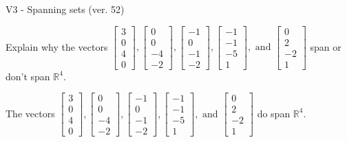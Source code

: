 \begin{exercise}
  \begin{exerciseTitle}V3 - Spanning sets (ver. 52)\end{exerciseTitle}
  \begin{exerciseStatement}
    Explain why the vectors \(\left[\begin{array}{r}
3 \\
0 \\
4 \\
0
\end{array}\right] , \left[\begin{array}{r}
0 \\
0 \\
-4 \\
-2
\end{array}\right] , \left[\begin{array}{r}
-1 \\
0 \\
-1 \\
-2
\end{array}\right] , \left[\begin{array}{r}
-1 \\
-1 \\
-5 \\
1
\end{array}\right] , \text{ and } \left[\begin{array}{r}
0 \\
2 \\
-2 \\
1
\end{array}\right]\) span or don't span \(\mathbb{R}^4\). 
	


  \end{exerciseStatement}
  \begin{exerciseAnswer}
   The vectors \(\left[\begin{array}{r}
3 \\
0 \\
4 \\
0
\end{array}\right] , \left[\begin{array}{r}
0 \\
0 \\
-4 \\
-2
\end{array}\right] , \left[\begin{array}{r}
-1 \\
0 \\
-1 \\
-2
\end{array}\right] , \left[\begin{array}{r}
-1 \\
-1 \\
-5 \\
1
\end{array}\right] , \text{ and } \left[\begin{array}{r}
0 \\
2 \\
-2 \\
1
\end{array}\right]\) 
  	 do  
	span \(\mathbb{R}^4\).
  



\end{exerciseAnswer}
\end{exercise}

